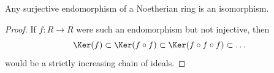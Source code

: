 \begin{lemma}
\label{lemma-surjective-endo-noetherian-ring-is-iso}
Any surjective endomorphism of a Noetherian ring is an isomorphism.
\end{lemma}

\begin{proof}
If $f : R \to R$ were such an endomorphism but not injective, then
$$
\Ker(f) \subset \Ker(f \circ f) \subset
\Ker(f \circ f \circ f) \subset \ldots
$$
would be a strictly increasing chain of ideals.
\end{proof}







